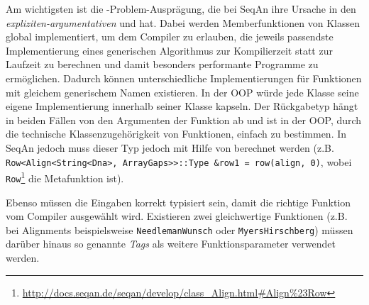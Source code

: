\begin{itemize}
\begin{description}
\begin{description}
      \label{sec:typing}Am wichtigsten ist die -Problem-Ausprägung, die bei SeqAn ihre Ursache in den \textit{expliziten-argumentativen}   und  hat. Dabei werden Memberfunktionen von Klassen global implementiert, um dem Compiler zu erlauben, die jeweils passendste Implementierung eines generischen Algorithmus zur Kompilierzeit statt zur Laufzeit zu berechnen und damit besonders performante Programme zu ermöglichen. Dadurch können unterschiedliche Implementierungen für Funktionen mit gleichem generischem Namen existieren. In der OOP würde jede Klasse seine eigene Implementierung innerhalb seiner Klasse kapseln. Der Rückgabetyp hängt in beiden Fällen von den Argumenten der Funktion ab und ist in der OOP, durch die technische Klassenzugehörigkeit von Funktionen, einfach zu bestimmen. In SeqAn jedoch muss dieser Typ jedoch mit Hilfe von  berechnet werden (z.B. \texttt{Row<Align<String<Dna>, ArrayGaps>>::Type &row1 = row(align, 0)}, wobei \texttt{Row}\footnote{\url{http://docs.seqan.de/seqan/develop/class_Align.html\#Align\%23Row}} die Metafunktion ist).
      
      Ebenso müssen die Eingaben korrekt typisiert sein, damit die richtige Funktion vom Compiler ausgewählt wird. Existieren zwei gleichwertige Funktionen (z.B. bei Alignments beispielsweise \texttt{NeedlemanWunsch} oder \texttt{MyersHirschberg}) müssen darüber hinaus so genannte \textit{Tags} als weitere Funktionsparameter verwendet werden.
      

\end{description}
\end{description}
\end{itemize}
